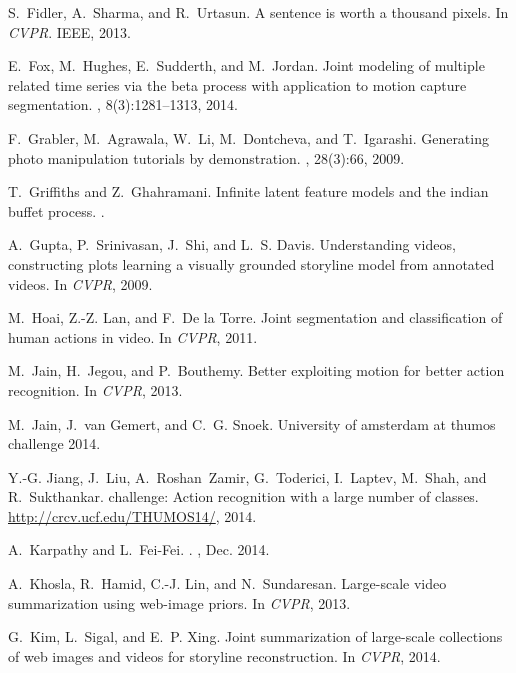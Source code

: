 \documentclass[10pt,twocolumn,letterpaper]{article}
\begin{document}
\begin{thebibliography}{10}
S.~Fidler, A.~Sharma, and R.~Urtasun.
\newblock A sentence is worth a thousand pixels.
\newblock In {\em CVPR}. IEEE, 2013.

E.~Fox, M.~Hughes, E.~Sudderth, and M.~Jordan.
\newblock Joint modeling of multiple related time series via the beta process
  with application to motion capture segmentation.
, 8(3):1281--1313, 2014.

F.~Grabler, M.~Agrawala, W.~Li, M.~Dontcheva, and T.~Igarashi.
\newblock Generating photo manipulation tutorials by demonstration.
, 28(3):66, 2009.

T.~Griffiths and Z.~Ghahramani.
\newblock Infinite latent feature models and the indian buffet process.
.

A.~Gupta, P.~Srinivasan, J.~Shi, and L.~S. Davis.
\newblock Understanding videos, constructing plots learning a visually grounded
  storyline model from annotated videos.
\newblock In {\em CVPR}, 2009.

M.~Hoai, Z.-Z. Lan, and F.~{De la Torre}.
\newblock Joint segmentation and classification of human actions in video.
\newblock In {\em CVPR}, 2011.

M.~Jain, H.~Jegou, and P.~Bouthemy.
\newblock Better exploiting motion for better action recognition.
\newblock In {\em CVPR}, 2013.

M.~Jain, J.~van Gemert, and C.~G. Snoek.
\newblock University of amsterdam at thumos challenge 2014.

Y.-G. Jiang, J.~Liu, A.~Roshan~Zamir, G.~Toderici, I.~Laptev, M.~Shah, and
  R.~Sukthankar.
 challenge: Action recognition with a large number of
  classes.
\newblock \url{http://crcv.ucf.edu/THUMOS14/}, 2014.

A.~{Karpathy} and L.~{Fei-Fei}.
.
, Dec. 2014.

A.~Khosla, R.~Hamid, C.-J. Lin, and N.~Sundaresan.
\newblock Large-scale video summarization using web-image priors.
\newblock In {\em CVPR}, 2013.

G.~Kim, L.~Sigal, and E.~P. Xing.
\newblock Joint summarization of large-scale collections of web images and
  videos for storyline reconstruction.
\newblock In {\em CVPR}, 2014.


\end{thebibliography}
\end{document}
